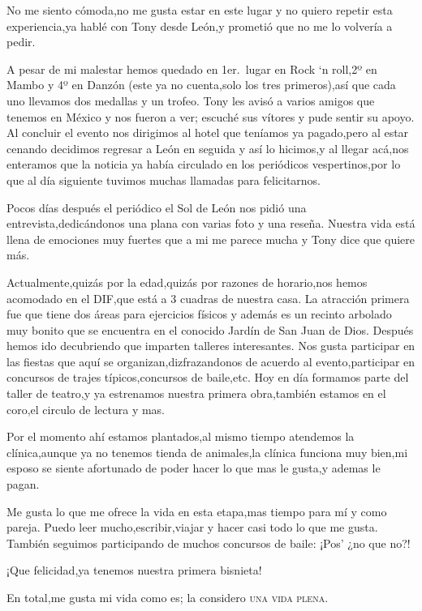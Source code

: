 \documentclass[letterpaper,12pt]{book}
\begin{document}
No me siento cómoda,no me gusta estar en este lugar y no quiero repetir esta experiencia,ya hablé con Tony desde León,y prometió que no me lo volvería a pedir. 

A pesar de mi malestar hemos quedado en 1er.\ lugar en Rock `n roll,2º en Mambo y 4º en Danzón (este ya no cuenta,solo los tres primeros),así que cada uno llevamos dos medallas y un trofeo. Tony les avisó a varios amigos que tenemos en México y nos fueron a ver; escuché sus vítores y pude sentir su apoyo. Al concluir el evento nos dirigimos al hotel que teníamos ya pagado,pero al estar cenando decidimos regresar a León en seguida y así lo hicimos,y al llegar acá,nos enteramos que la noticia ya había circulado en los periódicos vespertinos,por lo que al día siguiente tuvimos muchas llamadas para felicitarnos.

Pocos días después el periódico el Sol de León nos pidió una entrevista,dedicándonos una plana con varias foto y una reseña.
Nuestra vida está llena de emociones muy fuertes que a mi me parece mucha y Tony dice que quiere más.

Actualmente,quizás por la edad,quizás por razones de horario,nos hemos acomodado en el DIF,que está a 3 cuadras de nuestra casa. La atracción primera fue que tiene dos áreas para ejercicios físicos y además es un recinto arbolado muy bonito que se encuentra en el conocido Jardín de San Juan de Dios. Después hemos ido decubriendo que imparten talleres interesantes. Nos gusta participar en las fiestas que aquí se organizan,dizfrazandonos de acuerdo al evento,participar en concursos de trajes típicos,concursos de baile,etc.
Hoy en día formamos parte del taller de teatro,y ya estrenamos nuestra primera obra,también estamos en el coro,el circulo de lectura y mas.

Por el momento ahí estamos plantados,al mismo tiempo atendemos la clínica,aunque ya no tenemos tienda de animales,la clínica funciona muy bien,mi esposo se siente afortunado de poder hacer lo que mas le gusta,y ademas le pagan.

Me gusta lo que me ofrece la vida en esta etapa,mas tiempo para mí y como pareja. Puedo leer mucho,escribir,viajar y hacer casi todo lo que me gusta. También seguimos participando de muchos concursos de baile: ¡Pos' ¿no que no?!

¡Que felicidad,ya tenemos nuestra primera bisnieta!

En total,me gusta mi vida como es; la  considero \textsc{una vida plena}.
\end{document}
